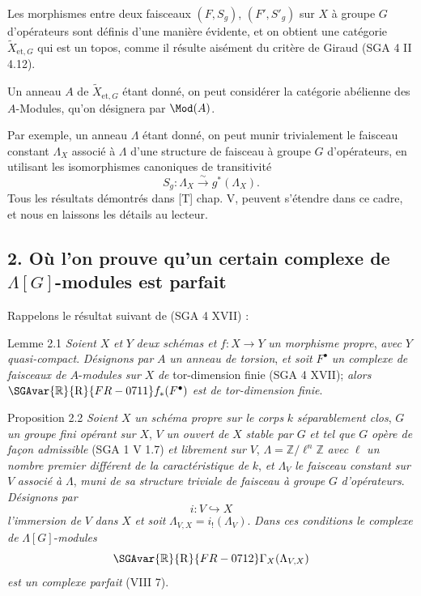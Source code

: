 Les morphismes entre deux faisceaux $(F,S_g)$, $(F',S'_g)$ sur $X$ à groupe $G$ d'opérateurs sont définis d'une manière évidente, et on obtient une catégorie $\widetilde X_{\mathrm{et},G}$ qui est un topos, comme il résulte aisément du critère de Giraud (SGA 4 II 4.12).

Un anneau $A$ de $\widetilde X_{\mathrm{et},G}$ étant donné, on peut considérer la catégorie abélienne des $A$-Modules, qu'on désignera par $\Mod(A)$.

Par exemple, un anneau $\Lambda$ étant donné, on peut munir trivialement le faisceau constant $\Lambda_X$ associé à $\Lambda$ d'une structure de faisceau à groupe $G$ d'opérateurs, en utilisant les isomorphismes canoniques de transitivité
\[
S_g:\Lambda_X\xrightarrow{\sim}g^*(\Lambda_X).
\]
Tous les résultats démontrés dans [T] chap. V, peuvent s'étendre dans ce cadre, et nous en laissons les détails au lecteur.

\subsection*{2. Où l'on prouve qu'un certain complexe de $\Lambda[G]$-modules est parfait}

Rappelons le résultat suivant de (SGA 4 XVII) :

\begin{statement}{Lemme 2.1}
\emph{Soient} $X$ \emph{et} $Y$ \emph{deux schémas et} $f:X\to Y$ \emph{un morphisme propre}, \emph{avec} $Y$ \emph{quasi-compact}. \emph{Désignons par} $A$ \emph{un anneau de torsion}, \emph{et soit} $F^\bullet$ \emph{un complexe de faisceaux de} $A$-\emph{modules sur} $X$ \emph{de} tor-dimension finie (SGA 4 XVII); \emph{alors} $\SGAvar{\mathbb{R}}{\mathrm{R}}{FR-0711} f_*(F^\bullet)$ \emph{est de tor-dimension finie}.
\end{statement}

\begin{statement}{Proposition 2.2}
\emph{Soient} $X$ \emph{un schéma propre sur le corps} $k$ \emph{séparablement clos}, $G$ \emph{un groupe fini opérant sur} $X$, $V$ \emph{un ouvert de} $X$ \emph{stable par} $G$ \emph{et tel que} $G$ \emph{opère de façon admissible} (SGA 1 V 1.7) \emph{et librement sur} $V$, $\Lambda=\mathbb{Z}/\ell^n\mathbb{Z}$ \emph{avec} $\ell$ \emph{un nombre premier différent de la caractéristique de} $k$, \emph{et} $\Lambda_V$ \emph{le faisceau constant sur} $V$ \emph{associé à} $\Lambda$, \emph{muni de sa structure triviale de faisceau à groupe} $G$ \emph{d'opérateurs}. \emph{Désignons par}
\[
i:V\hookrightarrow X
\]
\emph{l'immersion de} $V$ \emph{dans} $X$ \emph{et soit} $\Lambda_{V,X}=i_!(\Lambda_V)$. \emph{Dans ces conditions le complexe de} $\Lambda[G]$-\emph{modules}
\[
\SGAvar{\mathbb{R}}{\mathrm{R}}{FR-0712}\Gamma_X(\Lambda_{V,X})
\]
\emph{est un complexe parfait} (VIII 7).
\end{statement}

